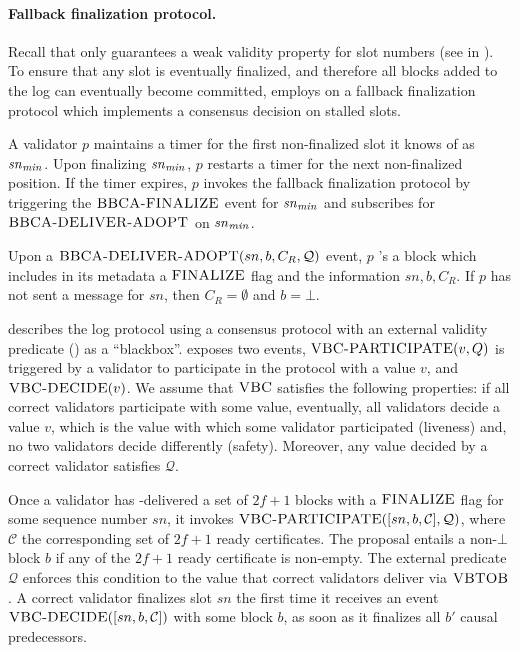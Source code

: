 \paragraph{Fallback finalization protocol.}
Recall that \primitive only guarantees a weak validity property for slot numbers (see  in ).
To ensure that any slot is eventually finalized, 
and therefore all blocks added to the log can eventually become committed,
\system employs on a fallback finalization protocol which implements a consensus decision on stalled slots.

A validator $p$ maintains a timer for the first non-finalized slot it knows of as $\mathit{sn}_{\mathit{min}}$.
Upon finalizing $\mathit{sn}_{\mathit{min}}$, $p$ restarts a timer for the next non-finalized position.
If the timer expires, $p$ invokes the fallback finalization protocol by triggering the $\textsc{BBCA-FINALIZE}$ event for $\mathit{sn}_{\mathit{min}}$
and subscribes for $\textsc{BBCA-DELIVER-ADOPT}$ on $\mathit{sn}_{\mathit{min}}$.

Upon a $\textsc{BBCA-DELIVER-ADOPT}(sn, b, C_R,\mathcal{Q})$ event, $p$ \primitive's a block which includes in its metadata a $\textsc{FINALIZE}$ flag and the information $sn, b, C_R$.
If $p$ has not sent a \ready message for $sn$, then $C_R=\emptyset$ and $b=\bot$.

 describes the log protocol using a consensus protocol with an external validity predicate (\vbc) as a ``blackbox''. 
\vbc exposes two events, $\textsc{VBC-PARTICIPATE}(v,Q)$ is triggered by a validator to participate in the protocol with a value $v$, and $\textsc{VBC-DECIDE}(v)$.
We assume that $\textsc{VBC}$ satisfies the following properties: if all correct validators participate with some value, eventually, all validators decide a value $v$, which is the value with which some validator participated (liveness) and, no two validators decide differently (safety).
Moreover, any value decided by a correct validator satisfies $\mathcal{Q}$.

Once a validator has \primitivesmall-delivered a set of $2f+1$ 
blocks with a $\textsc{FINALIZE}$ flag for some sequence number $sn$, it invokes $\textsc{VBC-PARTICIPATE}([sn,b,\mathcal{C}], \mathcal{Q})$, where $\mathcal{C}$ the corresponding set of $2f+1$ ready certificates.
The proposal entails a non-$\bot$ block $b$ if any of the $2f+1$ ready certificate is non-empty.
The external predicate $\mathcal{Q}$ enforces this condition to the value that correct validators deliver via $\textsc{VBTOB}$.
A correct validator finalizes slot $sn$ the first time it receives an event $\textsc{VBC-DECIDE}([sn,b,\mathcal{C}])$ with some block $b$, as soon as it finalizes all $b'$ causal predecessors.

